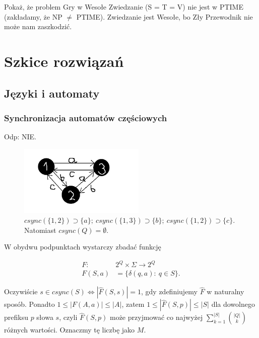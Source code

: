 \documentclass[a4paper,11pt]{article}
\newenvironment{zadanie}[1]
  {\renewcommand\theinnercustomthm{#1}\innercustomthm}
  {\endinnercustomthm}
\begin{document}
\begin{zadanie}{214'}
 Pokaż, że problem Gry w Wesołe Zwiedzanie (S = T = V) nie jest w PTIME (zakładamy, że NP $\neq$ PTIME). Zwiedzanie jest Wesołe,
 bo Zły Przewodnik nie może nam zaszkodzić.
\end{zadanie}



\section{Szkice rozwiązań}

\subsection{Języki i automaty}

\subsubsection{Synchronizacja automatów częściowych}

\begin{zadanie}{40}
\end{zadanie}

Odp: NIE. \\


\begin{figure}[h!]
  \centerline{%
    \includegraphics[width=6cm]{zad40.png}%
  }%
  \caption{$csync(\{1,2\}) \supset \{a\}; \ csync(\{1,3\}) \supset \{b\};\ csync(\{1,2\}) \supset \{c\}$. Natomiast $csync(Q) = \emptyset $.}
\end{figure}


\begin{zadanie}{41}
\end{zadanie}
W obydwu podpunktach wystarczy zbadać funkcję

\begin{align*}
 F :\ &2^Q \times \Sigma \longrightarrow 2^Q \\
 F(S,a) &= \{ \delta(q,a) : \ q \in S \}.
\end{align*}

Oczywiście $s \in csync(S) \Longleftrightarrow |\widehat{F}(S,s)| = 1$, gdy zdefiniujemy $\widehat{F}$ w naturalny sposób. 
Ponadto $1 \leqslant |F(A,a)| \leqslant |A|$, zatem $1 \leqslant |\widehat{F}(S,p)| \leqslant |S|$ dla dowolnego prefiksu $p$ słowa $s$,
czyli $\widehat{F}(S,p)$ może przyjmować co najwyżej $\displaystyle{\sum\limits^{|S|}_{k=1}\binom{|Q|}{k}}$ różnych wartości.
Oznaczmy tę liczbę jako $M$. \\ \\
\end{document}
